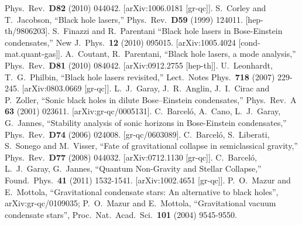 \documentclass[12pt]{article}
\begin{document}
\begin{thebibliography}{666}
  Phys.\ Rev.\  {\bf D82 } (2010) 044042.
  [arXiv:1006.0181 [gr-qc]].
S.~Corley and T.~Jacobson,
``Black hole lasers,''
  Phys.\ Rev.\  {\bf D59 } (1999)  124011.
  [hep-th/9806203].
S.~Finazzi and R.~Parentani
``Black hole lasers in Bose-Einstein condensates,''
  New J.\ Phys.\  {\bf 12 } (2010)  095015.
  [arXiv:1005.4024 [cond-mat.quant-gas]].
  A.~Coutant, R.~Parentani,
  ``Black hole lasers, a mode analysis,''
  Phys.\ Rev.\  {\bf D81 } (2010) 084042. 
  [arXiv:0912.2755 [hep-th]].
  U.~Leonhardt, T.~G.~Philbin,
  ``Black hole lasers revisited,''
  Lect.\ Notes Phys.\  {\bf 718 } (2007) 229-245.
[arXiv:0803.0669 [gr-qc]].
  L.~J.~Garay, J.~R.~Anglin, J.~I.~Cirac and P.~Zoller,
  ``Sonic black holes in dilute Bose--Einstein condensates,''
  Phys.\ Rev.\  A {\bf 63 }  (2001) 023611.
  [arXiv:gr-qc/0005131].
  C.~Barcel\'o, A.~Cano, L.~J.~Garay, G.~Jannes,
  ``Stability analysis of sonic horizons in Bose-Einstein condensates,''
  Phys.\ Rev.\  {\bf D74 } (2006)  024008.
  [gr-qc/0603089].
  C.~Barcel\'o, S.~Liberati, S.~Sonego and M.~Visser,
  ``Fate of gravitational collapse in semiclassical gravity,''
  Phys.\ Rev.\  {\bf D77 } (2008)  044032.
  [arXiv:0712.1130 [gr-qc]].
  C.~Barcel\'o, L.~J.~Garay, G.~Jannes,
  ``Quantum Non-Gravity and Stellar Collapse,''
  Found.\ Phys.\  {\bf 41 } (2011) 1532-1541.
  [arXiv:1002.4651 [gr-qc]].
P.~O.~Mazur and E.~Mottola,
``Gravitational condensate stars: An alternative to black holes'',
arXiv:gr-qc/0109035;
P.~O.~Mazur and E.~Mottola,
``Gravitational vacuum condensate stars'',
  Proc.\ Nat.\ Acad.\ Sci.\  {\bf 101 } (2004)  9545-9550.

\end{thebibliography}
\end{document}
